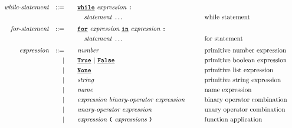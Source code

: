\begin{alignat*}{9}
&& \textit{while-statement} && ::= &\quad &&  \textbf{\texttt{\underline{while}}}\ \textit{expression} \ 
                                           \textbf{\texttt{:}}  \\
&&                       &&     &\quad && \quad \textit{statement} \ \ldots \quad
                                                           &&  \textrm{while statement} \\[1mm]
&& \textit{for-statement} && ::= &\quad &&  \textbf{\texttt{\underline{for}}}\ \textit{expression} \ 
                                           \textbf{\texttt{\underline{in}}}\ \textit{expression} \ \textbf{\texttt{:}}  \\
&&                       &&     &\quad && \quad \textit{statement} \ \ldots \quad
                                                           &&  \textrm{for statement} \\[1mm]
&& \textit{expression}   && ::= &\quad &&  \textit{number}   && \textrm{primitive number expression}\\
&&                       && |   &\quad && \textbf{\texttt{\underline{True}}}\ |\ \textbf{\texttt{\underline{False}}}
                                                           && \textrm{primitive boolean expression}\\
&&                       && |   &\quad &&  \textbf{\texttt{\underline{None}}} \   && \textrm{primitive list expression}\\
&&                       && |   &\quad &&  \textit{string}   && \textrm{primitive string expression}\\
&&                       && |   &\quad &&  \textit{name}   && \textrm{name expression}\\
&&                       && |   &\quad &&  \textit{expression} \  \textit{binary-operator} \ 
                                            \textit{expression} \qquad
                                                           && \textrm{binary operator combination}\\
&&                       && |   &\quad &&   \textit{unary-operator} \ 
                                            \textit{expression}
                                                           && \textrm{unary operator combination}\\
&&                       && |   &\quad &&   \textit{expression} \ 
                                            \textbf{\texttt{(}}\ \textit{expressions}\
                                            \textbf{\texttt{)}}
                                                           && \textrm{function application}\\

\end{alignat*}
